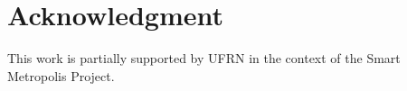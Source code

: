 \documentclass[conference,retainorgcmds]{IEEEtran}
\begin{document}







\section*{Acknowledgment}
This work is partially supported by UFRN in the context of the Smart Metropolis Project.


\appendices

% 
% 

\end{document}
